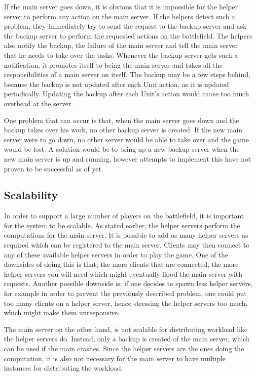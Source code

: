 If the main server goes down, it is obvious that it is impossible for the helper server to perform any action on the main server.
If the helpers detect such a problem, they immediately try to send the request to the backup server and ask the backup server to perform the requested actions on the battlefield.
The helpers also notify the backup, the failure of the main server and tell the main server that he needs to take over the tasks. %
Whenever the backup server gets such a notification, it promotes itself to being the main server and takes all the responsibilities of a main server on itself.
The backup may be a few steps behind, because the backup is not updated after each Unit action, as it is updated periodically. 
Updating the backup after each Unit's action would cause too much overhead at the server. 

One problem that can occur is that, when the main server goes down and the backup takes over his work, no other backup server is created. 
If the new main server were to go down, no other server would be able to take over and the game would be lost. 
A solution would be to bring up a new backup server when the new main server is up and running, however attempts to implement this have not proven to be successful as of yet.

\subsection{Scalability}
In order to support a large number of players on the battlefield, it is important for the system to be scalable.
As stated earlier, the helper servers perform the computations for the main server.
It is possible to add as many helper servers as required which can be registered to the main server.
Clients may then connect to any of these available helper servers in order to play the game. One of the downsides of doing this is that; the more clients that are connected, the more helper servers you will need which might eventually flood the main server with requests. Another possible downside is; if one decides to spawn less helper servers, for example in order to prevent the previously described problem, one could put too many clients on a helper server, hence stressing the helper servers too much, which might make them unresponsive.

The main server on the other hand, is not scalable for distributing workload like the helper servers do. 
Instead, only a backup is created of the main server, which can be used if the main crashes.
Since the helper servers are the ones doing the computation, it is also not necessary for the main server to have multiple instances for distributing the workload.
 
